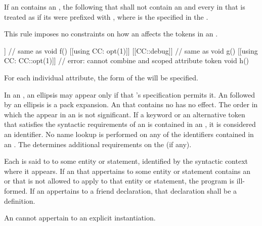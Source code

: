 \pnum
If an 
contains an ,
the  following that 
shall not contain an 
and every  in that 
is treated as if
its  were prefixed with ,
where  is the 
specified in the .
\begin{note}
This rule imposes no constraints on how
an 
affects the tokens in an .
\end{note}
\begin{example}
\begin{codeblock}
[[using CC: opt(1), debug]]         // same as 
  void f() {}
[[using CC: opt(1)]] [[CC::debug]]  // same as \tcode{[[CC::opt(1)]] [[CC::debug]]}
  void g() {}
[[using CC: CC::opt(1)]]            // error: cannot combine  and scoped attribute token
  void h() {}
\end{codeblock}
\end{example}

\pnum
\begin{note}
For each individual attribute, the form of the
 will be specified.
\end{note}

\pnum
In an , an ellipsis may appear only if that
's specification permits it. An  followed
by an ellipsis is a pack expansion.
An  that contains no  has no
effect. The order in which the  appear in an
 is not significant. If a
keyword
or an alternative token that satisfies the syntactic requirements
of an  is
contained in
an , it is considered an identifier. No name
lookup is performed on any of the identifiers contained in an
. The  determines additional
requirements on the  (if any).

\pnum
Each  is said to  to some entity or
statement, identified by the syntactic context
where it appears.
If an  that appertains to some
entity or statement contains an  or  that
is not allowed to apply to that
entity or statement, the program is ill-formed. If an 
appertains to a friend declaration, that declaration shall be a
definition.
\begin{note}
An  cannot appertain to
an explicit instantiation.
\end{note}

